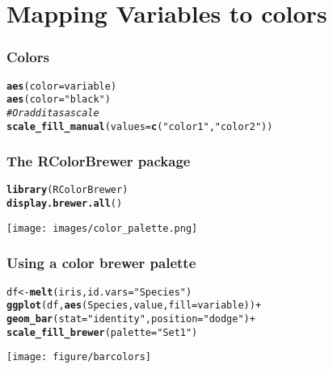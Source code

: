 \documentclass{beamer}\usepackage[]{graphicx}\usepackage[]{color}
\makeatletter
\newcommand{\hlstr}[1]{\textcolor[rgb]{0.192,0.494,0.8}{#1}}%
\newcommand{\hlcom}[1]{\textcolor[rgb]{0.678,0.584,0.686}{\textit{#1}}}%
\newcommand{\hlkwd}[1]{\textcolor[rgb]{0.737,0.353,0.396}{\textbf{#1}}}%
\newenvironment{kframe}{%
 \def\at@end@of@kframe{}%
 \ifinner\ifhmode%
  \def\at@end@of@kframe{\end{minipage}}%
  \begin{minipage}{\columnwidth}%
 \fi\fi%
 \def\FrameCommand##1{\hskip\@totalleftmargin \hskip-\fboxsep
 \colorbox{shadecolor}{##1}\hskip-\fboxsep
     \hskip-\linewidth \hskip-\@totalleftmargin \hskip\columnwidth}%
 \MakeFramed {\advance\hsize-\width
   \@totalleftmargin\z@ \linewidth\hsize
   \@setminipage}}%
 {\par\unskip\endMakeFramed%
 \at@end@of@kframe}
\newenvironment{knitrout}{}{} %
\makeatother
\begin{document}
\section*{Mapping Variables to colors}
\frame{\sectionpage}


\begin{frame}[fragile]
\frametitle{Colors}
\begin{knitrout}\footnotesize
{}\color{fgcolor}\begin{kframe}
\begin{alltt}
\hlkwd{aes}(color = variable)
\hlkwd{aes}(color = \hlstr{"black"})
\hlcom{# Or add it as a scale}
\hlkwd{scale_fill_manual}(values = \hlkwd{c}(\hlstr{"color1"}, \hlstr{"color2"}))
\end{alltt}
\end{kframe}
\end{knitrout}

\end{frame}


\begin{frame}[fragile]
\frametitle{The RColorBrewer package}
\begin{knitrout}\footnotesize
{}\color{fgcolor}\begin{kframe}
\begin{alltt}
\hlkwd{library}(RColorBrewer)
\hlkwd{display.brewer.all}()
\end{alltt}
\end{kframe}
\end{knitrout}

\begin{center}
\texttt{[image: images/color\_palette.png]}
\end{center}
\end{frame}

\begin{frame}[fragile]
\frametitle{Using a color brewer palette}
\begin{knitrout}\footnotesize
{}\color{fgcolor}\begin{kframe}
\begin{alltt}
df  <- \hlkwd{melt}(iris, id.vars = \hlstr{"Species"})
\hlkwd{ggplot}(df, \hlkwd{aes}(Species, value, fill = variable)) +
\hlkwd{geom_bar}(stat = \hlstr{"identity"}, position = \hlstr{"dodge"}) +
\hlkwd{scale_fill_brewer}(palette = \hlstr{"Set1"})
\end{alltt}
\end{kframe}

{\centering \texttt{[image: figure/barcolors]} 

}



\end{knitrout}

\end{frame}
\end{document}
